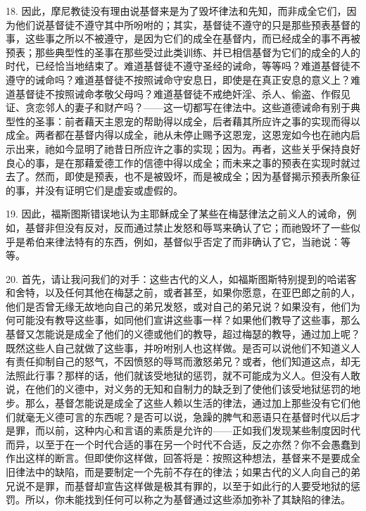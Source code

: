 18. 因此，摩尼教徒没有理由说基督来是为了毁坏律法和先知，而非成全它们，因为他们说基督徒不遵守其中所吩咐的；其实，基督徒不遵守的只是那些预表基督的事，这些事之所以不被遵守，是因为它们的成全在基督内，而已经成全的事不再被预表；那些典型性的圣事在那些受过此类训练、并已相信基督为它们的成全的人的时代，已经恰当地结束了。难道基督徒不遵守圣经的诫命，等等吗？难道基督徒不遵守的诫命吗？难道基督徒不按照诫命守安息日，即使是在真正安息的意义上？难道基督徒不按照诫命孝敬父母吗？难道基督徒不戒绝奸淫、杀人、偷盗、作假见证、贪恋邻人的妻子和财产吗？——这一切都写在律法中。这些道德诫命有别于典型性的圣事：前者藉天主恩宠的帮助得以成全，后者藉其所应许之事的实现而得以成全。两者都在基督内得以成全，祂从未停止赐予这恩宠，这恩宠如今也在祂内启示出来，祂如今显明了祂昔日所应许之事的实现；因为。再者，这些关乎保持良好良心的事，是在那藉爱德工作的信德中得以成全；而未来之事的预表在实现时就过去了。然而，即使是预表，也不是被毁坏，而是被成全；因为基督揭示预表所象征的事，并没有证明它们是虚妄或虚假的。\par

19. 因此，福斯图斯错误地认为主耶稣成全了某些在梅瑟律法之前义人的诫命，例如，基督非但没有反对，反而通过禁止发怒和辱骂来确认了它；而祂毁坏了一些似乎是希伯来律法特有的东西，例如，基督似乎否定了而非确认了它，当祂说：等等。\par

20. 首先，请让我问我们的对手：这些古代的义人，如福斯图斯特别提到的哈诺客和舍特，以及任何其他在梅瑟之前，或者甚至，如果你愿意，在亚巴郎之前的人，他们是否曾无缘无故地向自己的弟兄发怒，或对自己的弟兄说？如果没有，他们为何可能没有教导这些事，如同他们宣讲这些事一样？如果他们教导了这些事，那么基督又怎能说是成全了他们的义德或他们的教导，超过梅瑟的教导，通过加上呢？既然这些人自己就做了这些事，并吩咐别人也这样做。是否可以说他们不知道义人有责任抑制自己的怒气，不因愤怒的辱骂而激怒弟兄？或者，他们知道这点，却无法照此行事？那样的话，他们就该受地狱的惩罚，就不可能成为义人。但没有人敢说，在他们的义德中，对义务的无知和自制力的缺乏到了使他们该受地狱惩罚的地步。那么，基督怎能说是成全了这些人赖以生活的律法，通过加上那些没有它们他们就毫无义德可言的东西呢？是否可以说，急躁的脾气和恶语只在基督时代以后才是罪，而以前，这种内心和言语的素质是允许的——正如我们发现某些制度因时代而异，以至于在一个时代合适的事在另一个时代不合适，反之亦然？你不会愚蠢到作出这样的断言。但即使你这样做，回答将是：按照这种想法，基督来不是要成全旧律法中的缺陷，而是要制定一个先前不存在的律法；如果古代的义人向自己的弟兄说不是罪，而基督却宣告这样做是极其有罪的，以至于如此行的人要受地狱的惩罚。所以，你未能找到任何可以称之为基督通过这些添加弥补了其缺陷的律法。\par

